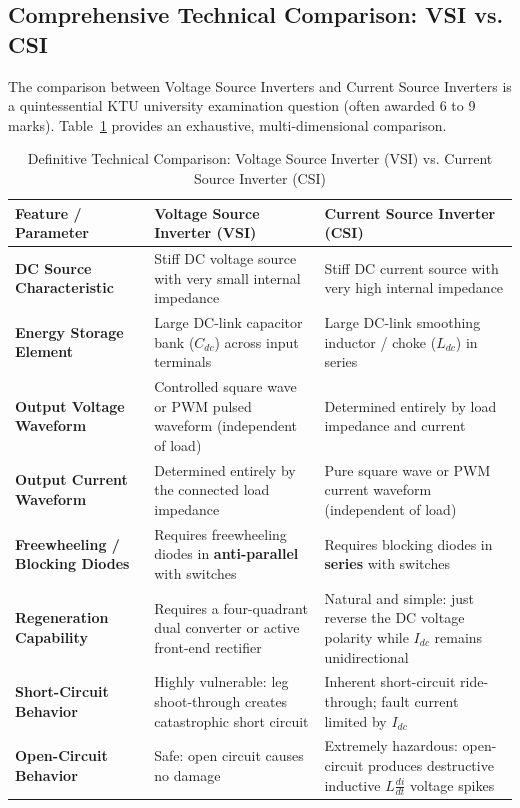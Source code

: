 \documentclass[11pt,a4paper]{article}
\begin{document}
\subsection{Comprehensive Technical Comparison: VSI vs. CSI}

The comparison between Voltage Source Inverters and Current Source Inverters is a quintessential KTU university examination question (often awarded 6 to 9 marks). Table~\ref{tab:vsi_vs_csi} provides an exhaustive, multi-dimensional comparison.

\begin{table}[htbp]
\centering
\small
\caption{Definitive Technical Comparison: Voltage Source Inverter (VSI) vs. Current Source Inverter (CSI)}
\label{tab:vsi_vs_csi}
\begin{tabularx}{\textwidth}{l p{6.5cm} X}
\toprule
\textbf{Feature / Parameter} & \textbf{Voltage Source Inverter (VSI)} & \textbf{Current Source Inverter (CSI)} \\
\midrule
\textbf{DC Source Characteristic} & Stiff DC voltage source with very small internal impedance & Stiff DC current source with very high internal impedance \\
\textbf{Energy Storage Element} & Large DC-link capacitor bank ($C_{dc}$) across input terminals & Large DC-link smoothing inductor / choke ($L_{dc}$) in series \\
\textbf{Output Voltage Waveform} & Controlled square wave or PWM pulsed waveform (independent of load) & Determined entirely by load impedance and current \\
\textbf{Output Current Waveform} & Determined entirely by the connected load impedance & Pure square wave or PWM current waveform (independent of load) \\
\textbf{Freewheeling / Blocking Diodes} & Requires freewheeling diodes in \textbf{anti-parallel} with switches & Requires blocking diodes in \textbf{series} with switches \\
\textbf{Regeneration Capability} & Requires a four-quadrant dual converter or active front-end rectifier & Natural and simple: just reverse the DC voltage polarity while $I_{dc}$ remains unidirectional \\
\textbf{Short-Circuit Behavior} & Highly vulnerable: leg shoot-through creates catastrophic short circuit & Inherent short-circuit ride-through; fault current limited by $I_{dc}$ \\
\textbf{Open-Circuit Behavior} & Safe: open circuit causes no damage & Extremely hazardous: open-circuit produces destructive inductive $L \frac{di}{dt}$ voltage spikes \\

\end{tabularx}
\end{table}
\end{document}
